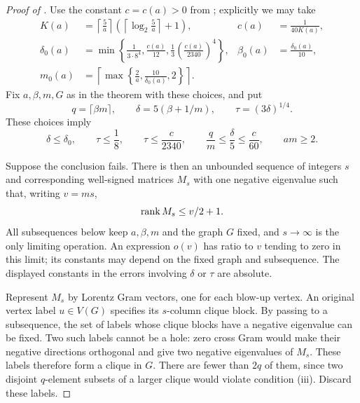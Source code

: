 \begin{proof}[Proof of ]
Use the constant $c=c(a)>0$ from ; explicitly we
may take
\begin{equation}\label{mr:constants}
 \begin{aligned}
 K(a)&=\left\lceil\frac5a\right\rceil
             \left(\left\lceil\log_2\frac5a\right\rceil+1\right),
 &c(a)&=\frac1{40K(a)},\\
 \delta_0(a)&=\min\left\{\frac1{3\cdot8^4},\frac{c(a)}{12},
                   \frac13\left(\frac{c(a)}{2340}\right)^4\right\},
 &\beta_0(a)&=\frac{\delta_0(a)}{10},\\
 m_0(a)&=\left\lceil\max\left\{\frac2a,
                                  \frac{10}{\delta_0(a)},2\right\}
                         \right\rceil.
 \end{aligned}
\end{equation}
Fix $a,\beta,m,G$ as in the theorem with these choices, and put
\begin{equation}\label{mr:error-parameters}
 q=\lceil\beta m\rceil,
 \qquad\delta=5(\beta+1/m),
 \qquad\tau=(3\delta)^{1/4}.
\end{equation}
These choices imply
\begin{equation}\label{mr:smallness}
 \delta\le\delta_0,
 \qquad\tau\le\frac18,
 \qquad\tau\le\frac{c}{2340},
 \qquad\frac qm\le\frac{\delta}{5}\le\frac c{60},
 \qquad am\ge2.
\end{equation}

Suppose the conclusion fails.  There is then an unbounded sequence of
integers $s$ and corresponding well-signed matrices $M_s$ with one
negative eigenvalue such that, writing $v=ms$,
\begin{equation}\label{mr:contradiction-rank}
 \operatorname{rank} M_s\le v/2+1.
\end{equation}
All subsequences below keep $a,\beta,m$ and the graph $G$ fixed, and
$s\to\infty$ is the only limiting operation.  An expression $o(v)$
has ratio to $v$ tending to zero in this limit; its constants may depend
on the fixed graph and subsequence.  The displayed constants in the
errors involving $\delta$ or $\tau$ are absolute.

Represent $M_s$ by Lorentz Gram vectors, one for each blow-up vertex.
An original vertex label $u\in V(G)$ specifies its $s$-column clique
block.  By passing to a subsequence, the set of labels whose clique
blocks have a negative eigenvalue can be fixed.  Two such labels cannot
be a hole: zero cross Gram would make their negative directions
orthogonal and give two negative eigenvalues of $M_s$.  These labels
therefore form a clique in $G$.  There are fewer than $2q$ of them,
since two disjoint $q$-element subsets of a larger clique would violate
condition (iii).  Discard these labels.


\end{proof}
